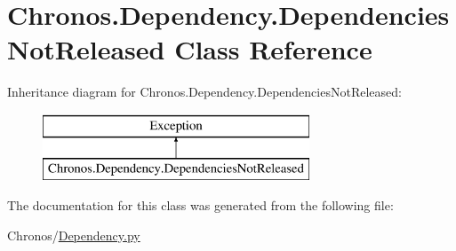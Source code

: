 \hypertarget{classChronos_1_1Dependency_1_1DependenciesNotReleased}{}\section{Chronos.\+Dependency.\+Dependencies\+Not\+Released Class Reference}
\label{classChronos_1_1Dependency_1_1DependenciesNotReleased}
Inheritance diagram for Chronos.\+Dependency.\+Dependencies\+Not\+Released\+:\begin{figure}[H]
\begin{center}
\leavevmode
\includegraphics[height=2.000000cm]{classChronos_1_1Dependency_1_1DependenciesNotReleased}
\end{center}
\end{figure}


The documentation for this class was generated from the following file\+:\begin{DoxyCompactItemize}
\item 
Chronos/\hyperlink{Dependency_8py}{Dependency.\+py}\end{DoxyCompactItemize}
